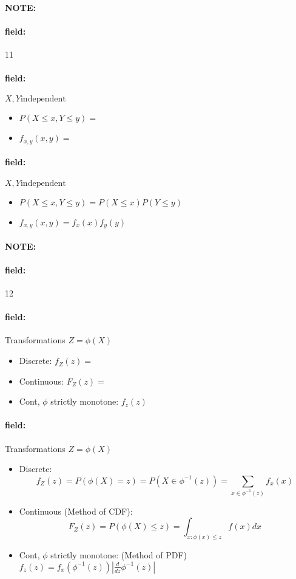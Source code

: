 \documentclass[12pt]{article}
\newenvironment{note}{\paragraph{NOTE:}}{}
\newenvironment{field}{\paragraph{field:}}{}
\begin{document}
\begin{note}
  \begin{field}
    \tiny 11
  \end{field}
  \begin{field}
    $X,Y \text{independent}$
    \begin{itemize}
      \item $P(X \leq x, Y \leq y) = $
      \item $f_{x,y}(x,y) = $
    \end{itemize}
  \end{field}
  \begin{field}
    $X,Y \text{independent}$
    \begin{itemize}
      \item $P(X \leq x, Y \leq y) = P(X \leq x)P(Y \leq y)$
      \item $f_{x,y}(x,y) = f_x(x)f_y(y)$
    \end{itemize}
  \end{field}
\end{note}

\begin{note}
  \begin{field}
    \tiny 12
  \end{field}
  \begin{field}
     Transformations $Z = \phi(X)$

    \begin{itemize}
      \item Discrete: $f_Z(z) = $
      \item Continuous: $F_Z(z)=$
      \item Cont, $\phi$ strictly monotone:
      $f_z(z)$
    \end{itemize}
  \end{field}
  \begin{field}
    Transformations $Z = \phi(X)$
  \begin{itemize}
    \item Discrete: $$f_Z(z) = P(\phi(X) = z) = P(X \in \phi^{-1}(z)) = \sum_{x \in \phi^{-1}(z)}f_x(x) $$
    \item Continuous (Method of CDF): $$F_Z(z)= P(\phi(X)\leq z) = \int_{x:\phi(x)\leq z} f(x) dx$$
    \item Cont, $\phi$ strictly monotone: (Method of PDF)
    $f_z(z) = f_x(\phi^{-1}(z))|\frac{d}{dz} \phi^{-1}(z)|$
  \end{itemize}
\end{field}
\end{note}
\end{document}
